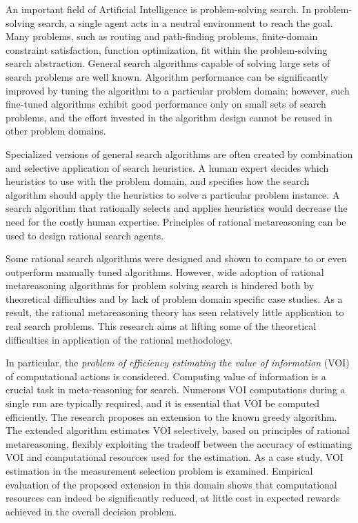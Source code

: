 An important field of Artificial Intelligence is
problem-solving search. In problem-solving search, a single agent acts
in a neutral environment to reach the goal. Many problems, such as
routing and path-finding problems, finite-domain constraint
satisfaction, function optimization, fit within the problem-solving
search abstraction. General search algorithms capable of solving large
sets of search problems are well known. Algorithm performance can be
significantly improved by tuning the algorithm to a particular problem
domain; however, such fine-tuned algorithms exhibit good performance
only on small sets of search problems, and the effort invested in the
algorithm design cannot be reused in other problem domains.

Specialized versions of general search algorithms are often created by
combination and selective application of search  heuristics.
A human expert decides which heuristics to use with the
problem domain, and specifies how the search algorithm should apply
the heuristics to solve a particular problem instance. A search
algorithm that rationally selects and applies heuristics would decrease
the need for the costly human expertise. Principles of rational
metareasoning can be used to design rational search agents.  

Some rational search algorithms were designed and shown to compare to
or even outperform manually tuned algorithms. However, wide adoption
of rational metareasoning algorithms for problem solving search is
hindered both by theoretical difficulties and by lack of problem
domain specific case studies. As a result, the rational metareasoning
theory has seen relatively little application to real search
problems. This research aims at lifting some of the theoretical
difficulties in application of the rational methodology. 

In particular, the \emph{problem of efficiency estimating the value of
information} (VOI) of computational actions is considered. Computing value of
information is a crucial task in meta-reasoning for search. Numerous
VOI computations during a single run are typically required, and it is
essential that VOI be computed efficiently. The research proposes
an extension to the known greedy algorithm. The extended algorithm
estimates VOI selectively, based on principles of rational
metareasoning, flexibly exploiting the tradeoff between the
accuracy of estimating VOI and computational resources used for the
estimation. As a case study, VOI estimation in the measurement selection
problem is examined.  Empirical evaluation of the proposed extension in this
domain shows that computational resources can indeed be significantly
reduced, at little cost in expected rewards achieved in the overall
decision problem.

